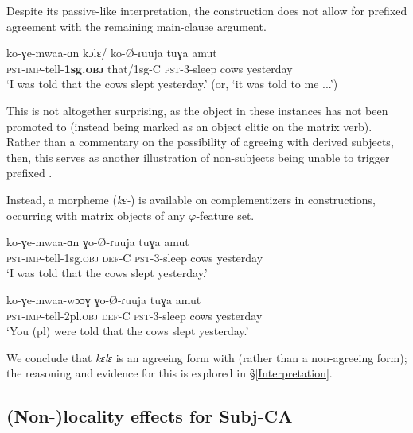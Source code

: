 \documentclass[output=paper
,newtxmath
,modfonts
,nonflat]{langsci/langscibook}
\begin{document}
Despite its passive-like interpretation, the  construction does not allow for prefixed agreement with the remaining main-clause argument.

\ea
\gll ko-ɣe-mwaa-ɑn kɔlɛ/ ko-\O-ɾuuja tuɣa amut \\
\textsc{pst-imp}-tell-\textbf{1sg.\textsc{obj}} that/1sg-C \textsc{pst}-3-sleep cows yesterday \\ 
\glt `I was told that the cows slept yesterday.' (or, `it was told to me ...')
\z

\noindent This is not altogether surprising, as the object in these instances has not been promoted to  (instead being marked as an object clitic on the matrix verb). Rather than a commentary on the possibility of agreeing with derived subjects, then, this serves as another illustration of non-subjects being unable to trigger prefixed . 

Instead, a  morpheme (\textit{kɛ-}) is available on complementizers in  constructions, occurring with  matrix objects of any $\varphi$-feature set. 

\ea \label{keleExamples}
\begin{xlist}

\ex 
\gll ko-ɣe-mwaa-ɑn  ɣo-\O-ɾuuja tuɣa amut \\
\textsc{pst-imp}-tell-1sg.\textsc{obj} \textsc{def}-C \textsc{pst}-3-sleep cows yesterday \\
\glt `I was told that the cows slept yesterday.'
	
\ex 
\gll ko-ɣe-mwaa-wɔɔɣ  ɣo-\O-ɾuuja tuɣa amut \\
\textsc{pst}-\textsc{imp}-tell-2pl.\textsc{obj} \textsc{def}-C \textsc{pst}-3-sleep cows yesterday \\
\glt `You (pl) were told that the cows slept yesterday.'

\end{xlist}
\z

\noindent We conclude that \textit{kɛlɛ} is an agreeing form with  (rather than a non-agreeing form); the reasoning and evidence for this is explored in  \S \ref{Interpretation}.

\subsection{(Non-)locality effects for Subj-CA} \label{Non Locality}
\end{document}
